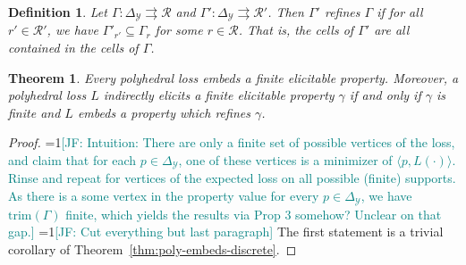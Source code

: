 \documentclass[11pt]{article}
\newcommand{\Comments}{1}
\newcommand{\mynote}[2]{\ifnum\Comments=1\textcolor{#1}{#2}\fi}
\newcommand{\mytodo}[2]{\ifnum\Comments=1%
  \todo[linecolor=#1!80!black,backgroundcolor=#1,bordercolor=#1!80!black]{#2}\fi}
\newcommand{\jessie}[1]{\mynote{teal}{[JF: #1]}}
\newcommand{\jessiet}[1]{\mytodo{teal!20!white}{JF: #1}}
\newcommand{\reals}{\mathbb{R}}
\newcommand{\simplex}{\Delta_\Y}
\newcommand{\R}{\mathcal{R}}
\newcommand{\Y}{\mathcal{Y}}
\newcommand{\inprod}[2]{\langle #1, #2 \rangle}%
\newcommand{\inter}[1]{\mathring{#1}}%
\newcommand{\toto}{\rightrightarrows}
\newcommand{\trim}{\mathrm{trim}}
\newtheorem{theorem}{Theorem}
\newtheorem{definition}{Definition}
\begin{document}
\begin{definition}
	Let $\Gamma:\simplex \toto \R$ and $\Gamma':\simplex\toto \R'$.
	Then $\Gamma'$ \emph{refines} $\Gamma$ if for all $r' \in \R'$, we have $\Gamma'_{r'} \subseteq \Gamma_r$ for some $r \in \R$.
	That is, the cells of $\Gamma'$ are all contained in the cells of $\Gamma$.
\end{definition}

\begin{theorem}\label{thm:ie-iff-embeds-refinement}
	Every polyhedral loss embeds a finite elicitable property.
	Moreover, a polyhedral loss $L$ indirectly elicits a finite elicitable property $\gamma$ if and only if $\gamma$ is finite and $L$ embeds a property which refines $\gamma$.
\end{theorem}
\begin{proof}
	\jessie{Intuition: There are only a finite set of possible vertices of the loss, and claim that for each $p \in \simplex$, one of these vertices is a minimizer of $\inprod{p}{L(\cdot)}$.  Rinse and repeat for vertices of the expected loss on all possible (finite) supports.  As there is a some vertex in the property value for every $p \in \simplex$, we have $\trim(\Gamma)$ finite, which yields the results via Prop 3 somehow?  Unclear on that gap.}
	\jessie{Cut everything but last paragraph}
	The first statement is a trivial corollary of Theorem~\ref{thm:poly-embeds-discrete}.
	

\end{proof}
\end{document}
